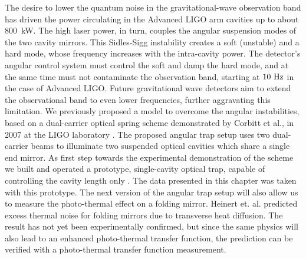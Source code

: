 The desire to lower the quantum noise in the gravitational-wave observation band has driven the power circulating in the Advanced LIGO arm cavities up to about 800~kW. 
The high laser power, in turn, couples the angular suspension modes of the two cavity mirrors. This Sidles-Sigg instability \cite{Sidles06} creates a soft (unstable) and a hard mode, whose frequency increases with the intra-cavity power. The detector's angular control system must control the soft and damp the hard mode, and at the same time must not contaminate the observation band, starting at $10~{\rm Hz}$ in the case of Advanced LIGO. 
Future gravitational wave detectors aim to extend the observational band to even lower frequencies, further aggravating this limitation.
We previously proposed a model \cite{Perreca14}  to overcome the angular instabilities, based on a dual-carrier optical spring scheme demonstrated by Corbitt et al., in 2007 at the LIGO laboratory \cite{Corbitt07}.
The proposed angular trap setup uses two dual-carrier beams to illuminate two suspended optical cavities which share a single end mirror. %
As first step towards the experimental demonstration of  the scheme we built and operated a prototype, single-cavity optical trap, capable of controlling the cavity length only \cite{LoughThesis}. The data presented in this chapter was taken with this prototype.
The next version of the angular trap setup will also allow us to measure the photo-thermal effect on a folding mirror. Heinert et. al. \cite{PhysRevD.90.042001}  predicted excess thermal noise for folding mirrors due to transverse heat diffusion.
The result has not yet been experimentally confirmed, but since the same physics will also lead to an enhanced photo-thermal transfer function, 
the prediction can be verified with a photo-thermal transfer function measurement.


